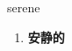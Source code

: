 
\begin{frame}
{\huge serene}
\begin{center}
\begin{enumerate}\Large
  \item \textbf{安静的}
\end{enumerate}
\end{center}
\end{frame}
